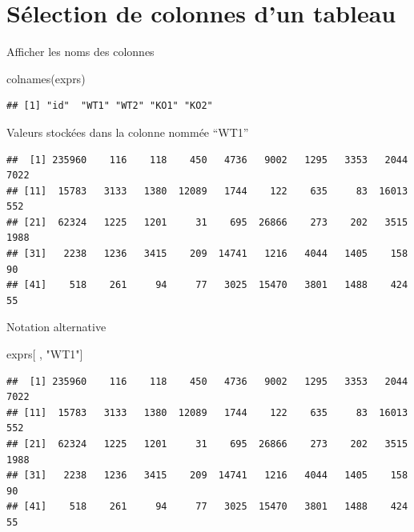 \documentclass[
]{book}
\newenvironment{Shaded}{\begin{snugshade}}{\end{snugshade}}
\newcommand{\FunctionTok}[1]{\textcolor[rgb]{0.00,0.00,0.00}{#1}}
\newcommand{\NormalTok}[1]{#1}
\newcommand{\SpecialCharTok}[1]{\textcolor[rgb]{0.00,0.00,0.00}{#1}}
\newcommand{\StringTok}[1]{\textcolor[rgb]{0.31,0.60,0.02}{#1}}
\begin{document}
\hypertarget{suxe9lection-de-colonnes-dun-tableau}{%
\section{Sélection de colonnes d'un tableau}\label{suxe9lection-de-colonnes-dun-tableau}}

Afficher les noms des colonnes

\begin{Shaded}
\begin{Highlighting}[]
\FunctionTok{colnames}\NormalTok{(exprs)}
\end{Highlighting}
\end{Shaded}

\begin{verbatim}
## [1] "id"  "WT1" "WT2" "KO1" "KO2"
\end{verbatim}

Valeurs stockées dans la colonne nommée ``WT1''

\begin{Shaded}
\end{Shaded}

\begin{verbatim}
##  [1] 235960    116    118    450   4736   9002   1295   3353   2044   7022
## [11]  15783   3133   1380  12089   1744    122    635     83  16013    552
## [21]  62324   1225   1201     31    695  26866    273    202   3515   1988
## [31]   2238   1236   3415    209  14741   1216   4044   1405    158     90
## [41]    518    261     94     77   3025  15470   3801   1488    424     55
\end{verbatim}

Notation alternative

\begin{Shaded}
\begin{Highlighting}[]
\NormalTok{exprs[ , }\StringTok{"WT1"}\NormalTok{]}
\end{Highlighting}
\end{Shaded}

\begin{verbatim}
##  [1] 235960    116    118    450   4736   9002   1295   3353   2044   7022
## [11]  15783   3133   1380  12089   1744    122    635     83  16013    552
## [21]  62324   1225   1201     31    695  26866    273    202   3515   1988
## [31]   2238   1236   3415    209  14741   1216   4044   1405    158     90
## [41]    518    261     94     77   3025  15470   3801   1488    424     55
\end{verbatim}
\end{document}
